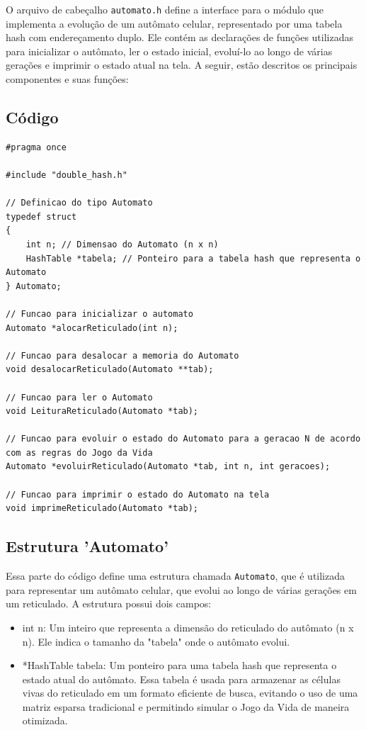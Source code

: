 \documentclass{article}
\begin{document}
O arquivo de cabeçalho \verb|automato.h| define a interface para o módulo que implementa a evolução de um autômato celular, representado por uma tabela hash com endereçamento duplo. Ele contém as declarações de funções utilizadas para inicializar o autômato, ler o estado inicial, evoluí-lo ao longo de várias gerações e imprimir o estado atual na tela.
A seguir, estão descritos os principais componentes e suas funções: 

\subsection{Código}
\begin{lstlisting}[caption={},label={lst:cod1},language={[x86masm]Assembler}]
#pragma once

#include "double_hash.h"

// Definicao do tipo Automato
typedef struct
{
    int n; // Dimensao do Automato (n x n)
    HashTable *tabela; // Ponteiro para a tabela hash que representa o Automato
} Automato;

// Funcao para inicializar o automato
Automato *alocarReticulado(int n);

// Funcao para desalocar a memoria do Automato
void desalocarReticulado(Automato **tab);

// Funcao para ler o Automato
void LeituraReticulado(Automato *tab);

// Funcao para evoluir o estado do Automato para a geracao N de acordo com as regras do Jogo da Vida
Automato *evoluirReticulado(Automato *tab, int n, int geracoes);

// Funcao para imprimir o estado do Automato na tela
void imprimeReticulado(Automato *tab);
 \end{lstlisting}
 
 \subsection{Estrutura 'Automato'}

Essa parte do código define uma estrutura chamada \verb|Automato|, que é utilizada para representar um autômato celular, que evolui ao longo de várias gerações em um reticulado. A estrutura possui dois campos:  

\begin{itemize}
    \item int n: Um inteiro que representa a dimensão do reticulado do autômato (n x n). Ele indica o tamanho da "tabela" onde o autômato evolui.
    \item *HashTable tabela: Um ponteiro para uma tabela hash que representa o estado atual do autômato. Essa tabela é usada para armazenar as células vivas do reticulado em um formato eficiente de busca, evitando o uso de uma matriz esparsa tradicional e permitindo simular o Jogo da Vida de maneira otimizada.
 
\end{itemize}
\end{document}
